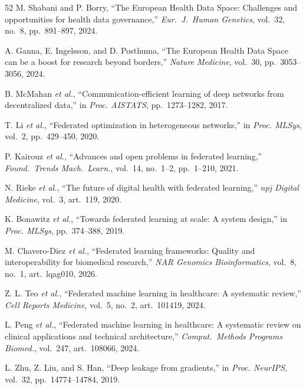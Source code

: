 \documentclass[conference,a4paper]{IEEEtran}
\begin{document}
\begin{thebibliography}{52}
M. Shabani and P. Borry, ``The European Health Data Space: Challenges and opportunities for health data governance,'' \textit{Eur.~J.~Human Genetics}, vol.~32, no.~8, pp.~891--897, 2024.

A. Ganna, E. Ingelsson, and D. Posthuma, ``The European Health Data Space can be a boost for research beyond borders,'' \textit{Nature Medicine}, vol.~30, pp.~3053--3056, 2024.

B. McMahan \textit{et al.}, ``Communication-efficient learning of deep networks from decentralized data,'' in \textit{Proc. AISTATS}, pp.~1273--1282, 2017.

T. Li \textit{et al.}, ``Federated optimization in heterogeneous networks,'' in \textit{Proc. MLSys}, vol.~2, pp.~429--450, 2020.

P. Kairouz \textit{et al.}, ``Advances and open problems in federated learning,'' \textit{Found.~Trends Mach.~Learn.}, vol.~14, no.~1--2, pp.~1--210, 2021.

N. Rieke \textit{et al.}, ``The future of digital health with federated learning,'' \textit{npj Digital Medicine}, vol.~3, art.~119, 2020.

K. Bonawitz \textit{et al.}, ``Towards federated learning at scale: A system design,'' in \textit{Proc. MLSys}, pp.~374--388, 2019.

M. Chavero-Diez \textit{et al.}, ``Federated learning frameworks: Quality and interoperability for biomedical research,'' \textit{NAR Genomics Bioinformatics}, vol.~8, no.~1, art.~lqag010, 2026.

Z. L. Teo \textit{et al.}, ``Federated machine learning in healthcare: A systematic review,'' \textit{Cell Reports Medicine}, vol.~5, no.~2, art.~101419, 2024.

L. Peng \textit{et al.}, ``Federated machine learning in healthcare: A systematic review on clinical applications and technical architecture,'' \textit{Comput.~Methods Programs Biomed.}, vol.~247, art.~108066, 2024.

L. Zhu, Z. Liu, and S. Han, ``Deep leakage from gradients,'' in \textit{Proc. NeurIPS}, vol.~32, pp.~14774--14784, 2019.


\end{thebibliography}
\end{document}
